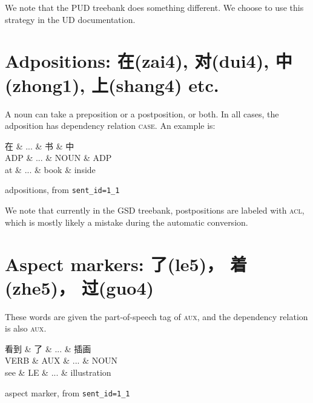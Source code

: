 \documentclass[UTF8,oneside]{book}
\def\aux{\textsc{aux}}
\begin{document}
We note that the PUD treebank does something different. We choose to use this strategy in the UD documentation. 

\newpage
\section{Adpositions: 在(zai4), 对(dui4), 中(zhong1), 上(shang4) etc.}

A noun can take a preposition or a postposition, or both. In all cases, the adposition has dependency relation \textsc{case}. An example is:

\begin{tree}[h]
\centering
\begin{dependency}[theme=simple]
\begin{deptext}[column sep=.5cm, row sep=.5ex]
在  \& ... \& 书 \& 中 \\
ADP \& ... \& NOUN \& ADP \\
at \& ... \& book \& inside \\
\end{deptext}
\end{dependency}
\caption{adpositions, from \texttt{sent\_id=1\_1}}
\end{tree}

We note that currently in the GSD treebank, postpositions are labeled with \textsc{acl}, which is mostly likely a mistake during the automatic conversion. 

\newpage
\section{Aspect markers: 了(le5)， 着(zhe5)， 过(guo4)}

These words are given the part-of-speech tag of \aux, and the dependency relation is also \aux. 

\begin{tree}[h]
\centering
\begin{dependency}[theme=simple]
\begin{deptext}[column sep=.5cm, row sep=.5ex]
看到 \& 了  \& ... \& 插画 \\
VERB \& AUX \&  ... \& NOUN \\
see \& LE \& ... \& illustration \\
\end{deptext}
\end{dependency}
\caption{aspect marker, from \texttt{sent\_id=1\_1}}
\end{tree}
\end{document}
